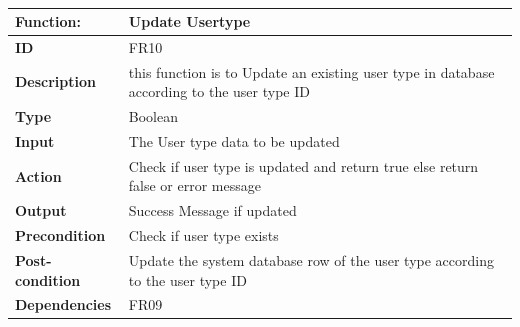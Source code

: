 \documentclass[]{article}
\begin{document}
\begin{table}[h]
\caption{}
\label{tab:my-table}
\begin{tabular}{|p{}|p{}|}
\hline
\textbf{Function:} & Update Usertype
\\ \hline
\textbf{ID}  & FR10          

\\ \hline
\textbf{Description} & this function is to Update an existing user type in database according to the user type ID \\ \hline
\textbf{Type}    &  Boolean       

\\ \hline
\textbf{Input}   & The User type data to be updated 

\\ \hline
\textbf{Action}  & Check if user type is updated and return true else return false or error message 

\\ \hline
\textbf{Output}  & Success Message if updated

\\ \hline
\textbf{Precondition}  & Check if user type exists    

\\ \hline
\textbf{Post-condition} & Update the system database row of the user type according to the user type ID  
\\ \hline
\textbf{Dependencies}  & FR09
\\ \hline
\end{tabular}
\end{table}
\end{document}
